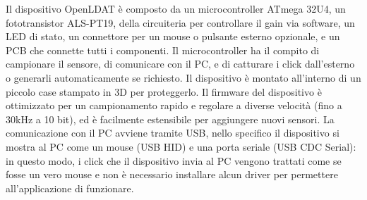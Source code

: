 \documentclass[a4paper]{article}
\begin{document}
Il dispositivo OpenLDAT è composto da un microcontroller ATmega 32U4, un fototransistor ALS-PT19, della circuiteria per controllare il gain via software, un LED di stato, un connettore per un mouse o pulsante esterno opzionale, e un PCB che connette tutti i componenti. Il microcontroller ha il compito di campionare il sensore, di comunicare con il PC, e di catturare i click dall'esterno o generarli automaticamente se richiesto. Il dispositivo è montato all'interno di un piccolo case stampato in 3D per proteggerlo. Il firmware del dispositivo è ottimizzato per un campionamento rapido e regolare a diverse velocità (fino a 30kHz a 10 bit), ed è facilmente estensibile per aggiungere nuovi sensori. La comunicazione con il PC avviene tramite USB, nello specifico il dispositivo si mostra al PC come un mouse (USB HID) e una porta seriale (USB CDC Serial): in questo modo, i click che il dispositivo invia al PC vengono trattati come se fosse un vero mouse e non è necessario installare alcun driver per permettere all'applicazione di funzionare.
\end{document}
